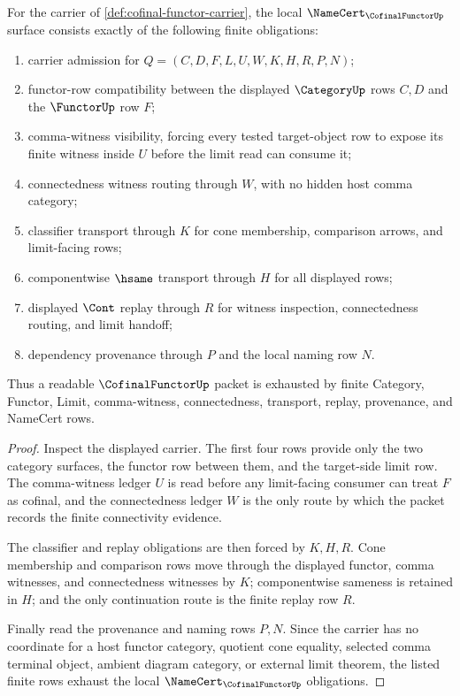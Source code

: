 \begin{theorem}
\label{thm:cofinal-functor-namecert-obligations}
For the carrier of \autoref{def:cofinal-functor-carrier}, the local $\NameCert_{\CofinalFunctorUp}$ surface consists exactly of the following finite obligations:
\begin{enumerate}
\item carrier admission for $Q=(C,D,F,L,U,W,K,H,R,P,N)$;
\item functor-row compatibility between the displayed $\CategoryUp$ rows $C,D$ and the $\FunctorUp$ row $F$;
\item comma-witness visibility, forcing every tested target-object row to expose its finite witness inside $U$ before the limit read can consume it;
\item connectedness witness routing through $W$, with no hidden host comma category;
\item classifier transport through $K$ for cone membership, comparison arrows, and limit-facing rows;
\item componentwise $\hsame$ transport through $H$ for all displayed rows;
\item displayed $\Cont$ replay through $R$ for witness inspection, connectedness routing, and limit handoff;
\item dependency provenance through $P$ and the local naming row $N$.
\end{enumerate}
Thus a readable $\CofinalFunctorUp$ packet is exhausted by finite Category, Functor, Limit, comma-witness, connectedness, transport, replay, provenance, and NameCert rows.
\end{theorem}
\begin{proof}
Inspect the displayed carrier. The first four rows provide only the two category surfaces, the functor row between them, and the target-side limit row. The comma-witness ledger $U$ is read before any limit-facing consumer can treat $F$ as cofinal, and the connectedness ledger $W$ is the only route by which the packet records the finite connectivity evidence.

The classifier and replay obligations are then forced by $K,H,R$. Cone membership and comparison rows move through the displayed functor, comma witnesses, and connectedness witnesses by $K$; componentwise sameness is retained in $H$; and the only continuation route is the finite replay row $R$.

Finally read the provenance and naming rows $P,N$. Since the carrier has no coordinate for a host functor category, quotient cone equality, selected comma terminal object, ambient diagram category, or external limit theorem, the listed finite rows exhaust the local $\NameCert_{\CofinalFunctorUp}$ obligations.
\end{proof}

